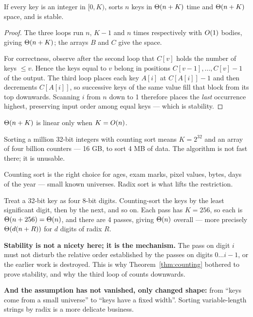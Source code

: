 \begin{theorem}\label{thm:counting}
If every key is an integer in $[0, K)$,  sorts $n$ keys
in $\Theta(n + K)$ time and $\Theta(n + K)$ space, and is stable.
\end{theorem}

\begin{proof}
The three loops run $n$, $K-1$ and $n$ times respectively with $O(1)$
bodies, giving $\Theta(n+K)$; the arrays $B$ and $C$ give the space.

\smallskip
For correctness, observe after the second loop that $C[v]$ holds the number of
keys $\le v$. Hence the keys equal to $v$ belong in positions
$C[v-1], \ldots, C[v]-1$ of the output. The third loop places each key $A[i]$
at $C[A[i]] - 1$ and then decrements $C[A[i]]$, so successive keys of the same
value fill that block from its top downwards. Scanning $i$ from $n$ down to 1
therefore places the \emph{last} occurrence highest, preserving input order
among equal keys --- which is stability.
\end{proof}

\begin{alertbox}
$\Theta(n+K)$ is linear only when $K = O(n)$.

\smallskip
Sorting a million 32-bit integers with counting sort means $K = 2^{32}$ and an
array of four billion counters --- 16 GB, to sort 4 MB of data. The algorithm
is not fast there; it is unusable.

\smallskip
Counting sort is the right choice for ages, exam marks, pixel values, bytes,
days of the year --- small known universes. Radix sort is what lifts the
restriction.
\end{alertbox}

\begin{conceptbox}
Treat a 32-bit key as four 8-bit digits. Counting-sort the keys by the least
significant digit, then by the next, and so on. Each pass has $K = 256$, so
each is $\Theta(n + 256) = \Theta(n)$, and there are 4 passes, giving
$\Theta(n)$ overall --- more precisely $\Theta(d(n+R))$ for $d$ digits of
radix $R$.

\smallskip
\textbf{Stability is not a nicety here; it is the mechanism.} The pass on digit
$i$ must not disturb the relative order established by the passes on digits
$0 \ldots i-1$, or the earlier work is destroyed. This is why
Theorem~\ref{thm:counting} bothered to prove stability, and why the third loop
of  counts downwards.

\smallskip
\textbf{And the assumption has not vanished, only changed shape:} from ``keys
come from a small universe'' to ``keys have a fixed width''. Sorting
variable-length strings by radix is a more delicate business.
\end{conceptbox}

